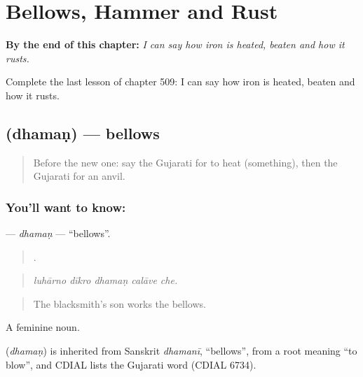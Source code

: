 
\chapter{Bellows, Hammer and Rust}
\label{ch:gu-bellows-hammer-and-rust}

\begin{chapteropening}
\textbf{By the end of this chapter:} \emph{I can say how iron is heated, beaten and how it rusts.}

Complete the last lesson of chapter 509: I can say how iron is heated, beaten and how it rusts.
\end{chapteropening}

\section[\texorpdfstring{\gu{ધમણ} (dhamaṇ)}{ધમણ (dhamaṇ)}]{ (dhamaṇ) — bellows}

\label{lesson:GU-C509-dhaman}



\begin{quote}
Before the new one: say the Gujarati for to heat (something), then the Gujarati for an anvil.
\end{quote}

\subsection*{You'll want to know: }
\textbf{} — \emph{dhamaṇ} — \textquotedblleft{}bellows\textquotedblright{}.

\begin{quote}
    .
\end{quote}

\begin{quote}
\emph{luhārno dīkro dhamaṇ calāve che.}
\end{quote}

\begin{quote}
The blacksmith's son works the bellows.
\end{quote}

A feminine noun.

\begin{cousinweb}
\textbf{} (\emph{dhamaṇ}) is inherited from Sanskrit \emph{dhamanī}, \textquotedblleft{}bellows\textquotedblright{}, from a root meaning \textquotedblleft{}to blow\textquotedblright{}, and CDIAL lists the Gujarati word (CDIAL 6734).
\end{cousinweb}


